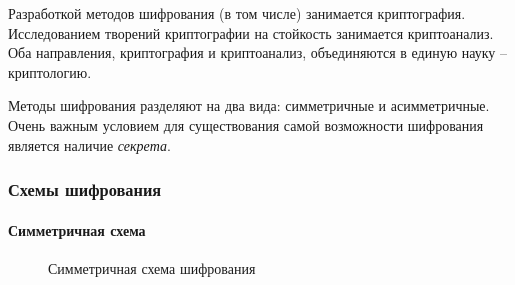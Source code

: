 Разработкой методов шифрования (в том числе) занимается криптография. Исследованием творений криптографии на стойкость занимается криптоанализ. Оба направления, криптография и криптоанализ, объединяются в единую науку – криптологию.

Методы шифрования разделяют на два вида: симметричные и асимметричные. Очень важным условием для существования самой возможности шифрования является наличие \emph{секрета}.


\begin{frame}
    \frametitle{Схемы шифрования}
    \framesubtitle{Симметричная схема}
    \begin{figure}
        \begin{center}
        \end{center}
        \caption{Симметричная схема шифрования}\label{pict:symmcipher}
    \end{figure} 
\end{frame}


